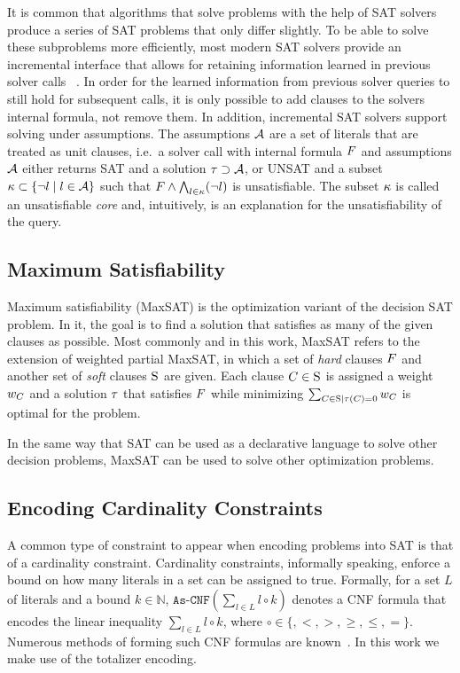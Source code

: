 It is common that algorithms that solve problems with the help of SAT solvers produce a series of SAT problems that only differ slightly.
To be able to solve these subproblems more efficiently, most modern SAT solvers provide an incremental interface that allows for retaining information learned in previous solver calls~\autocite{DBLP:journals/entcs/EenS03,handbook2-cdcl} .
In order for the learned information from previous solver queries to still hold for subsequent calls, it is only possible to add clauses to the solvers internal formula, not remove them.
In addition, incremental SAT solvers support solving under assumptions.
The assumptions $\mathcal{A}$ are a set of literals that are treated as unit clauses, i.e.\ a solver call with internal formula $F$ and assumptions $\mathcal{A}$ either returns SAT and a solution $\tau \supset \mathcal{A}$, or UNSAT and a subset $\kappa \subset \{\lnot l \mid l\in\mathcal{A}\}$ such that $F \land \bigwedge_{l \in \kappa} (\lnot l)$ is unsatisfiable.
The subset $\kappa$ is called an unsatisfiable \emph{core} and, intuitively, is an explanation for the unsatisfiability of the query.

\subsection{Maximum Satisfiability\label{sec:max-sat}}

Maximum satisfiability (MaxSAT) is the optimization variant of the decision SAT problem.
In it, the goal is to find a solution that satisfies as many of the given clauses as possible.
Most commonly and in this work, MaxSAT refers to the extension of weighted partial MaxSAT, in which a set of \emph{hard} clauses $F$ and another set of \emph{soft} clauses $\textsc{S}$ are given.
Each clause $C \in \textsc{S}$ is assigned a weight $w_C$ and a solution $\tau$ that satisfies $F$ while minimizing $\sum_{C\in\textsc{S} \mid \tau(C)=0} w_C$ is optimal for the problem.

In the same way that SAT can be used as a declarative language to solve other decision problems, MaxSAT can be used to solve other optimization problems.

\subsection{Encoding Cardinality Constraints\label{sec:card-const}}

A common type of constraint to appear when encoding problems into SAT is that of a cardinality constraint.
Cardinality constraints, informally speaking, enforce a bound on how many literals in a set can be assigned to true.
Formally, for a set $L$ of literals and a bound $k \in \mathbb{N}$, $\texttt{As-CNF}\left(\sum_{l \in L} l \circ k\right)$ denotes a CNF formula that encodes the linear inequality $\sum_{l \in L} l \circ k$, where $\circ \in \{ ,< ,> ,\geq, \leq, =\}$.
Numerous methods of forming such CNF formulas are known~\autocite{DBLP:conf/cp/BailleuxB03}.
In this work we make use of the totalizer encoding.

